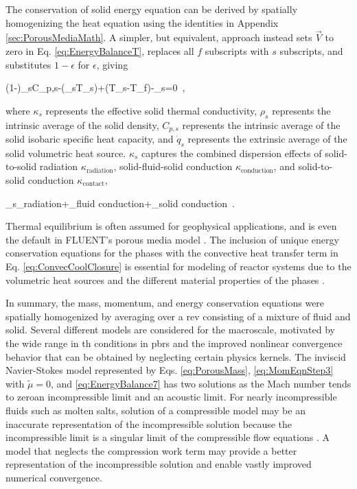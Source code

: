 The conservation of solid energy equation can be derived by spatially homogenizing the heat equation using the identities in Appendix \ref{sec:PorousMediaMath}. A simpler, but equivalent, approach instead sets \(\vec{V}\) to zero in Eq. \eqref{eq:EnergyBalanceT}, replaces all \(f\) subscripts with \(s\) subscripts, and substitutes \(1-\epsilon\) for \(\epsilon\), giving

\beq
\label{eq:SolidPorous}
(1-\epsilon)\rho_sC_{p,s}-\nabla\cdot(\kappa_s\nabla T_s)+\alpha(T_s-T_f)-_s=0\ ,
\eeq

\noindent where \(\kappa_s\) represents the effective solid thermal conductivity, \(\rho_s\) represents the intrinsic average of the solid density, \(C_{p,s}\) represents the intrinsic average of the solid isobaric specific heat capacity, and \(\dot{q}_s\) represents the extrinsic average of the solid volumetric heat source. \(\kappa_s\) captures the combined dispersion effects of solid-to-solid radiation \(\kappa_\text{radiation}\), solid-fluid-solid conduction \(\kappa_\text{conduction}\), and solid-to-solid conduction \(\kappa_\text{contact}\),

\beq
\label{eq:Kappa}
\kappa_s\equiv\kappa_{\textrm{radiation}}+\kappa_{\textrm{fluid conduction}}+\kappa_{\textrm{solid conduction}}\ .
\eeq

\noindent Thermal equilibrium is often assumed for geophysical applications, and is even the default in FLUENT's porous media model \cite{fluent}. The inclusion of unique energy conservation equations for the phases with the convective heat transfer term in Eq. \eqref{eq:ConvecCoolClosure} is essential for modeling of reactor systems due to the volumetric heat sources and the different material properties of the phases \cite{becker,novak_sana}.

In summary, the mass, momentum, and energy conservation equations were spatially homogenized by averaging over a \gls{rev} consisting of a mixture of fluid and solid. Several different models are considered for the macroscale, motivated by the wide range in \gls{th} conditions in \glspl{pbr} and the improved nonlinear convergence behavior that can be obtained by neglecting certain physics kernels. The inviscid Navier-Stokes model represented by Eqs. \eqref{eq:PorousMass}, \eqref{eq:MomEqnStep3} with \(\tilde{\mu}=0\), and \eqref{eq:EnergyBalance7} has two solutions as the Mach number tends to zero\mdash an incompressible limit and an acoustic limit. For nearly incompressible fluids such as molten salts, solution of a compressible model may be an inaccurate representation of the incompressible solution because the incompressible limit is a singular limit of the compressible flow equations \cite{guillard}. A model that neglects the compression work term may provide a better representation of the incompressible solution and enable vastly improved numerical convergence.

